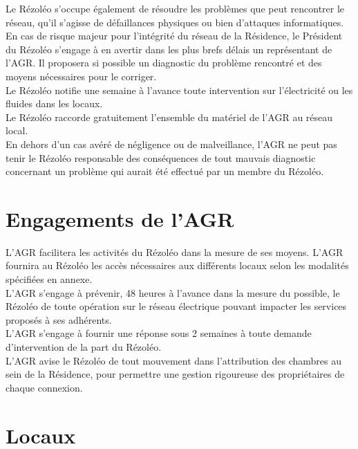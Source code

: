 \documentclass[12pt]{constitution}
\begin{document}
    Le Rézoléo s'occupe également de résoudre les problèmes que peut rencontrer le réseau, qu'il s'agisse de défaillances physiques ou bien d'attaques informatiques.\\

    En cas de risque majeur pour l'intégrité du réseau de la Résidence, le Président du Rézoléo s'engage à en avertir dans les plus brefs délais un représentant de l'AGR. Il proposera si possible un diagnostic du problème rencontré et des moyens nécessaires pour le corriger.\\


    Le Rézoléo notifie une semaine à l'avance toute intervention sur l'électricité ou les fluides dans les locaux.\\


    Le Rézoléo raccorde gratuitement l'ensemble du matériel de l'AGR au réseau local.\\


    En dehors d'un cas avéré de négligence ou de malveillance, l'AGR ne peut pas tenir le Rézoléo responsable des conséquences de tout mauvais diagnostic concernant un problème qui aurait été effectué par un membre du Rézoléo.


\section{Engagements de l'AGR}

     L'AGR facilitera les activités du Rézoléo dans la mesure de ses moyens. L'AGR fournira au Rézoléo les accès nécessaires aux différents locaux selon les modalités spécifiées en annexe.\\


    L'AGR s'engage à prévenir, 48 heures à l'avance dans la mesure du possible, le Rézoléo de toute opération sur le réseau électrique pouvant impacter les services proposés à ses adhérents.\\


    L'AGR s'engage à fournir une réponse sous 2 semaines à toute demande d'intervention de la part du Rézoléo.\\


    L'AGR avise le Rézoléo de tout mouvement dans l'attribution des chambres au sein de la Résidence, pour permettre une gestion rigoureuse des propriétaires de chaque connexion.\\

\section{Locaux}
\end{document}
